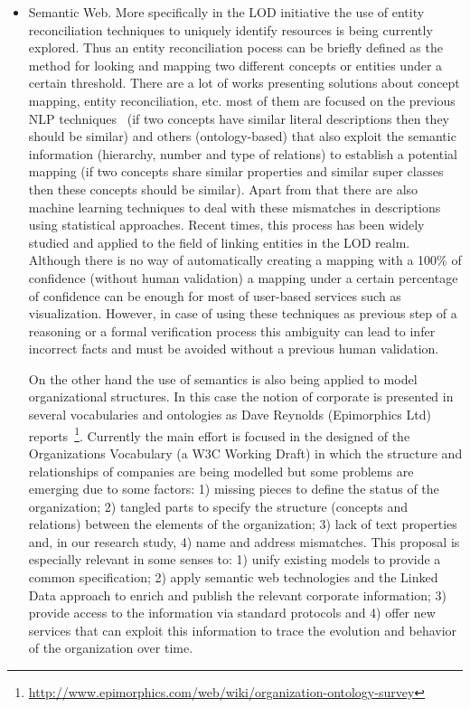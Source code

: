 \documentclass{llncs}
\begin{document}
\begin{itemize}
 \item Semantic Web. More specifically in the LOD initiative the use of entity reconciliation techniques to uniquely identify resources 
 is being currently explored. Thus an entity reconciliation pocess can be briefly defined as the method for looking and mapping two different 
 concepts or entities under a certain threshold. There are a lot of  works presenting solutions about concept mapping, entity reconciliation, etc. 
 most of them are focused on the previous NLP techniques~\cite{conf/www/MaaliCP11,Serimi} (if two concepts have similar literal descriptions then they should be similar) 
 and others (ontology-based) that also exploit the semantic information (hierarchy, number and type of relations) to establish a potential mapping 
 (if two concepts share similar properties and similar super classes then these concepts should be similar). Apart from that 
 there are also machine learning techniques to deal with these mismatches in descriptions using statistical approaches. Recent times, 
 this process has been widely studied and applied to the field of linking entities in the LOD realm. Although there is no way of automatically 
 creating a mapping with a 100\% of confidence (without human validation) a mapping under a certain percentage of confidence can be 
 enough for most of user-based services such as visualization. However, in case of using these techniques as previous step of a reasoning or 
 a formal verification process this ambiguity can lead to infer incorrect facts and must be avoided without a previous human validation. 

 On the other hand the use of semantics is also being applied to model organizational structures. In this case the notion 
 of corporate is presented in several vocabularies and ontologies as Dave Reynolds (Epimorphics Ltd) reports~\footnote{\url{http://www.epimorphics.com/web/wiki/organization-ontology-survey}}. 
 Currently the main effort is focused in the designed of the Organizations Vocabulary (a W3C Working Draft) in which the structure and 
 relationships of companies are being modelled but some problems are emerging due to some factors: 1) missing pieces to define the status of the organization; 
 2) tangled parts to specify the structure (concepts and relations) between the elements of the organization; 
 3) lack of text properties and, in our research study, 4) name and address mismatches. This proposal is especially relevant in some senses to: 
 1) unify existing models to provide a common specification; 2) apply semantic web technologies and the Linked Data approach to enrich 
 and publish the relevant corporate information; 3) provide access to the information via standard protocols 
 and 4) offer new services that can exploit this information to trace the evolution and behavior of the organization over time.


\end{itemize}
\end{document}
